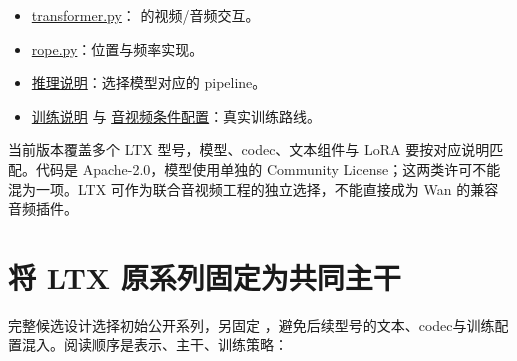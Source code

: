 \begin{itemize}
\tightlist
\item
  \href{https://github.com/Lightricks/LTX-2/blob/daa6b16fc7f0f1628f2c9e36a303e3312b333cc6/packages/ltx-core/src/ltx_core/model/transformer/transformer.py}{transformer.py}： 的视频/音频交互。
\item
  \href{https://github.com/Lightricks/LTX-2/blob/daa6b16fc7f0f1628f2c9e36a303e3312b333cc6/packages/ltx-core/src/ltx_core/model/transformer/rope.py}{rope.py}：位置与频率实现。
\item
  \href{https://github.com/Lightricks/LTX-2/blob/daa6b16fc7f0f1628f2c9e36a303e3312b333cc6/packages/ltx-pipelines/README.md}{推理说明}：选择模型对应的 pipeline。
\item
  \href{https://github.com/Lightricks/LTX-2/blob/daa6b16fc7f0f1628f2c9e36a303e3312b333cc6/packages/ltx-trainer/README.md}{训练说明} 与 \href{https://github.com/Lightricks/LTX-2/blob/daa6b16fc7f0f1628f2c9e36a303e3312b333cc6/packages/ltx-trainer/configs/av2av_ic_lora.yaml}{音视频条件配置}：真实训练路线。
\end{itemize}

当前版本覆盖多个 LTX 型号，模型、codec、文本组件与 LoRA 要按对应说明匹配。代码是 Apache-2.0，模型使用单独的 Community License；这两类许可不能混为一项。LTX 可作为联合音视频工程的独立选择，不能直接成为 Wan 的兼容音频插件。

\section{将 LTX 原系列固定为共同主干}\label{seedance-m15-ux5c06-ltx-ux539fux7cfbux5217ux56faux5b9aux4e3aux5171ux540cux4e3bux5e72}

完整候选设计选择初始公开系列，另固定 ，避免后续型号的文本、codec与训练配置混入。阅读顺序是表示、主干、训练策略：

